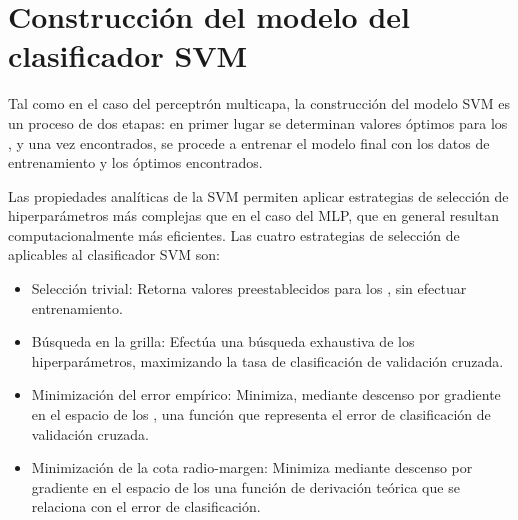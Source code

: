 %
%
\section{Construcción del modelo del clasificador SVM}
%
Tal como en el caso del perceptrón multicapa, la construcción del
modelo SVM es un proceso de dos etapas: en primer lugar se determinan
valores óptimos para los , y una vez encontrados, se procede
a entrenar el modelo final con los datos de entrenamiento y los
 óptimos encontrados.

Las propiedades analíticas de la SVM permiten aplicar estrategias de
selección de hiperparámetros más complejas que en el caso del MLP, que
en general resultan computacionalmente más eficientes.
Las cuatro estrategias de selección de  aplicables al
clasificador SVM son:
%
\begin{itemize}
\item
  Selección trivial: Retorna valores preestablecidos para los
  , sin efectuar entrenamiento.
\item
  Búsqueda en la grilla: Efectúa una búsqueda exhaustiva de los
  hiperparámetros, maximizando la tasa de clasificación de validación
  cruzada.
\item
  Minimización del error empírico: Minimiza, mediante descenso por
  gradiente en el espacio de los , una función que representa
  el error de clasificación de validación cruzada.
\item
  Minimización de la cota radio-margen: Minimiza mediante descenso por
  gradiente en el espacio de los  una función de derivación
  teórica que se relaciona con el error de clasificación.
\end{itemize}
%
